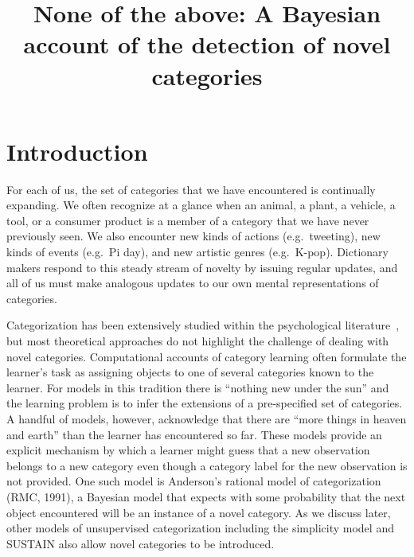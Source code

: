 \documentclass[doc]{apa6}
\title{None of the above: A Bayesian account of the detection of novel categories}
\begin{document}
	\maketitle
	\noindent
\newpage


\section{Introduction}


For each of us, the set of categories that we have encountered is continually expanding.  We often recognize at a glance when an animal, a plant, a vehicle, a tool, or a consumer product is a member of a category that we have never previously seen.  We also encounter new kinds of actions (e.g.\ tweeting), new kinds of events (e.g.\ Pi day), and new artistic genres (e.g.\ K-pop).  Dictionary makers respond to this steady stream of novelty by issuing regular updates, and all of us must make analogous updates to our own mental representations of categories.

Categorization has been extensively studied within the psychological literature~\cite{nosofsky_attention_1986, murphy_big_2002}, but most theoretical approaches do not highlight the challenge of dealing with novel categories.  Computational accounts of category learning often formulate the learner's task as assigning objects to one of several categories known to the learner.  For models in this tradition there is ``nothing new under the sun'' and the learning problem is to infer the extensions of a pre-specified set of categories. A handful of models, however, acknowledge that there are ``more things in heaven and earth'' than the learner has encountered so far. These models provide an explicit mechanism by which a learner might guess that a new observation belongs to a new category even though a category label for the new observation is not provided. One such model is Anderson's rational model of categorization (RMC, 1991)\nocite{anderson_adaptive_1991}, a Bayesian model that expects with some probability that the next object encountered will be an instance of a novel category. As we discuss later, other models of unsupervised categorization including the simplicity model \cite{pothos_simplicity_2002} and SUSTAIN \cite{love_sustain:_2004} also allow novel categories to be introduced.
\end{document}
